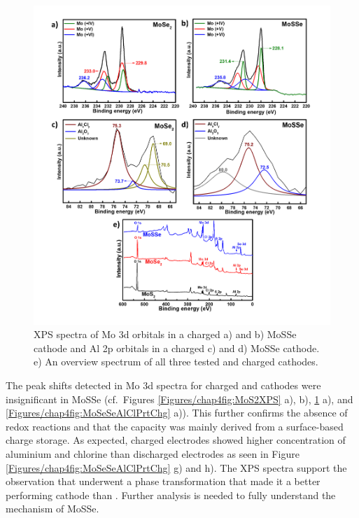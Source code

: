 \begin{figure}
  \centering
  \includegraphics[width=\textwidth]{Figures/chap4fig/MoAlOverallMoSeMoSSe}
  \caption{XPS spectra of Mo 3d orbitals in a charged a)  and b) MoSSe cathode and Al 2p orbitals in a charged c)  and d) MoSSe cathode. e) An overview spectrum of all three tested and charged cathodes.}
  \label{Figures/chap4fig:MoAlOverallMoSeMoSSe}
\end{figure}

The peak shifts detected in Mo 3d spectra for charged  and  cathodes were insignificant in MoSSe (cf.\ Figures \ref{Figures/chap4fig:MoS2XPS} a), b), \ref{Figures/chap4fig:MoAlOverallMoSeMoSSe} a), and \ref{Figures/chap4fig:MoSeSeAlClPrtChg} a)). This further confirms the absence of redox reactions and that the capacity was mainly derived from a surface-based charge storage. As expected, charged electrodes showed higher concentration of aluminium and chlorine than discharged electrodes as seen in Figure \ref{Figures/chap4fig:MoSeSeAlClPrtChg} g) and h). The XPS spectra support the observation that  underwent a phase transformation that made it a better performing cathode than . Further analysis is needed to fully understand the mechanism of MoSSe.


